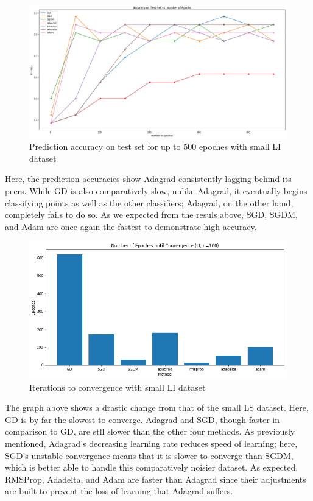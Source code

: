 \documentclass[twoside,11pt]{homework}
\begin{document}
\begin{figure}[H]
		\centering
		\includegraphics[scale=.3]{q5/insep_100/acc.png}
		\caption{Prediction accuracy on test set for up to 500 epoches with small LI dataset}
	\end{figure}

Here, the prediction accuracies show Adagrad consistently lagging behind its peers. While GD is also comparatively slow, unlike Adagrad, it eventually begins classifying points as well as the other classifiers; Adagrad, on the other hand, completely fails to do so. As we expected from the resuls above, SGD, SGDM, and Adam are once again the fastest to demonstrate high accuracy.

\begin{figure}[H]
		\centering
		\includegraphics[scale=.5]{q5/insep_100/time.png}
		\caption{Iterations to convergence with small LI dataset}
	\end{figure}

The graph above shows a drastic change from that of the small LS dataset. Here, GD is by far the slowest to converge. Adagrad and SGD, though faster in comparison to GD, are stll slower than the other four methods. As previously mentioned, Adagrad's decreasing learning rate reduces speed of learning; here, SGD's unstable convergence means that it is slower to converge than SGDM, which is better able to handle this comparatively noisier dataset. As expected, RMSProp, Adadelta, and Adam are faster than Adagrad since their adjustments are built to prevent the loss of learning that Adagrad suffers.
\end{document}

